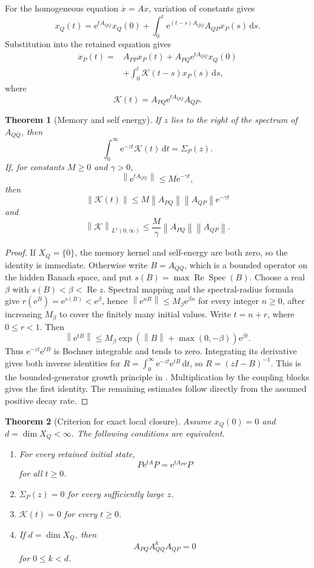 \documentclass{aomart}
\newtheorem{theorem}{Theorem}[section]
\theoremstyle{definition}
\theoremstyle{remark}
\newcommand{\Kcal}{\mathcal K}
\newcommand{\Spec}{\operatorname{Spec}}
\newcommand{\e}{\mathrm e}
\newcommand{\dd}{\,\mathrm d}
\newcommand{\norm}[1]{\left\lVert#1\right\rVert}
\begin{document}
For the homogeneous equation \(\dot x=Ax\), variation of constants gives
\[
x_Q(t)
=
\e^{tA_{QQ}}x_Q(0)
+
\int_0^t
\e^{(t-s)A_{QQ}}A_{QP}x_P(s)
\dd s.
\]
Substitution into the retained equation gives
\[
\begin{aligned}
\dot x_P(t)
={}&
A_{PP}x_P(t)
+
A_{PQ}\e^{tA_{QQ}}x_Q(0)\\
&+
\int_0^t
\Kcal(t-s)x_P(s)
\dd s,
\end{aligned}
\]
where
\[
\Kcal(t)
=
A_{PQ}\e^{tA_{QQ}}A_{QP}.
\]

\begin{theorem}[Memory and self energy]\label{thm:memory_self_energy}
If \(z\) lies to the right of the spectrum of \(A_{QQ}\), then
\[
\int_0^\infty
\e^{-zt}\Kcal(t)\dd t
=
\Sigma_P(z).
\]
If, for constants \(M\geq0\) and \(\gamma>0\),
\[
\norm{\e^{tA_{QQ}}}
\leq
M\e^{-\gamma t},
\]
then
\[
\norm{\Kcal(t)}
\leq
M\norm{A_{PQ}}\norm{A_{QP}}\e^{-\gamma t}
\]
and
\[
\norm{\Kcal}_{L^1(0,\infty)}
\leq
\frac{M}{\gamma}
\norm{A_{PQ}}\norm{A_{QP}}.
\]
\end{theorem}

\begin{proof}
If \(X_Q=\{0\}\), the memory kernel and self-energy are both zero, so the identity is immediate. Otherwise write \(B=A_{QQ}\), which is a bounded operator on the hidden Banach space, and put \(s(B)=\max\operatorname{Re}\Spec(B)\). Choose a real \(\beta\) with \(s(B)<\beta<\operatorname{Re}z\). Spectral mapping and the spectral-radius formula give \(r(\e^B)=\e^{s(B)}<\e^\beta\), hence \(\norm{\e^{nB}}\leq M_\beta\e^{\beta n}\) for every integer \(n\geq0\), after increasing \(M_\beta\) to cover the finitely many initial values. Write \(t=n+r\), where \(0\leq r<1\). Then
\[
\norm{\e^{tB}}\leq M_\beta\exp(\norm B+\max(0,-\beta))\e^{\beta t}.
\]
Thus \(\e^{-zt}\e^{tB}\) is Bochner integrable and tends to zero. Integrating its derivative gives both inverse identities for \(R=\int_0^\infty\e^{-zt}\e^{tB}\dd t\), so \(R=(zI-B)^{-1}\). This is the bounded-generator growth principle in \cite[Chapter IV, Corollary 3.12]{EngelNagel2000}. Multiplication by the coupling blocks gives the first identity. The remaining estimates follow directly from the assumed positive decay rate.
\end{proof}

\begin{theorem}[Criterion for exact local closure]\label{thm:local_closure}
Assume \(x_Q(0)=0\) and \(d=\dim X_Q<\infty\). The following conditions are equivalent.
\begin{enumerate}
\item For every retained initial state,
\[
P\e^{tA}P
=
\e^{tA_{PP}}P
\]
for all \(t\geq0\).
\item \(\Sigma_P(z)=0\) for every sufficiently large \(z\).
\item \(\Kcal(t)=0\) for every \(t\geq0\).
\item If \(d=\dim X_Q\), then
\[
A_{PQ}A_{QQ}^kA_{QP}=0
\]
for \(0\leq k<d\).
\end{enumerate}
\end{theorem}
\end{document}
